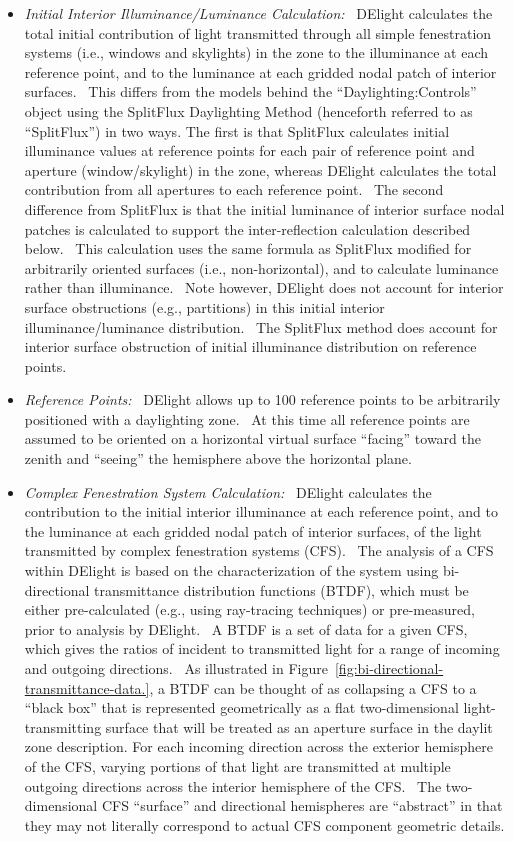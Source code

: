 \begin{itemize}
\item
  \emph{Initial Interior Illuminance/Luminance Calculation:}~ DElight calculates the total initial contribution of light transmitted through all simple fenestration systems (i.e., windows and skylights) in the zone to the illuminance at each reference point, and to the luminance at each gridded nodal patch of interior surfaces.~ This differs from the models behind the ``Daylighting:Controls'' object using the SplitFlux Daylighting Method (henceforth referred to as ``SplitFlux'') in two ways. The first is that SplitFlux calculates initial illuminance values at reference points for each pair of reference point and aperture (window/skylight) in the zone, whereas DElight calculates the total contribution from all apertures to each reference point.~ The second difference from SplitFlux is that the initial luminance of interior surface nodal patches is calculated to support the inter-reflection calculation described below.~ This calculation uses the same formula as SplitFlux modified for arbitrarily oriented surfaces (i.e., non-horizontal), and to calculate luminance rather than illuminance.~ Note however, DElight does not account for interior surface obstructions (e.g., partitions) in this initial interior illuminance/luminance distribution.~ The SplitFlux method does account for interior surface obstruction of initial illuminance distribution on reference points.
\item
  \emph{Reference Points:}~ DElight allows up to 100 reference points to be arbitrarily positioned with a daylighting zone.~ At this time all reference points are assumed to be oriented on a horizontal virtual surface ``facing'' toward the zenith and ``seeing'' the hemisphere above the horizontal plane.
\item
  \emph{Complex Fenestration System Calculation:}~ DElight calculates the contribution to the initial interior illuminance at each reference point, and to the luminance at each gridded nodal patch of interior surfaces, of the light transmitted by complex fenestration systems (CFS).~ The analysis of a CFS within DElight is based on the characterization of the system using bi-directional transmittance distribution functions (BTDF), which must be either pre-calculated (e.g., using ray-tracing techniques) or pre-measured, prior to analysis by DElight.~ A BTDF is a set of data for a given CFS, which gives the ratios of incident to transmitted light for a range of incoming and outgoing directions.~ As illustrated in Figure~\ref{fig:bi-directional-transmittance-data.}, a BTDF can be thought of as collapsing a CFS to a ``black box'' that is represented geometrically as a flat two-dimensional light-transmitting surface that will be treated as an aperture surface in the daylit zone description. For each incoming direction across the exterior hemisphere of the CFS, varying portions of that light are transmitted at multiple outgoing directions across the interior hemisphere of the CFS.~ The two-dimensional CFS ``surface'' and directional hemispheres are ``abstract'' in that they may not literally correspond to actual CFS component geometric details.
\end{itemize}

